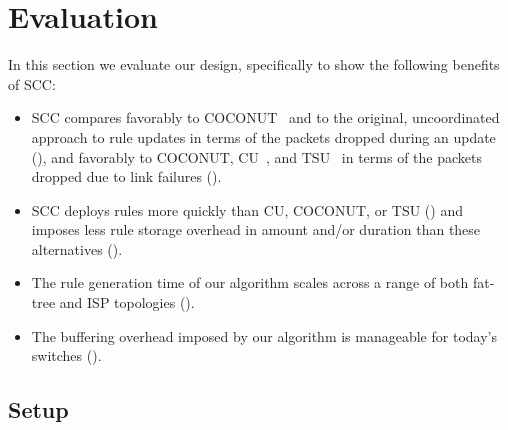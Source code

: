 \newcommand{\coconut}{\textup{COCONUT}}
\newcommand{\cu}{\textup{CU}}
\newcommand{\sys}{\textup{SCC}}
\newcommand{\tsu}{\textup{TSU}}
\newcommand{\org}{\textup{Original}}
\newcommand{\ylabel}{Number of lost packets}
\newcommand{\xlabel}{Packets per second}
\newcommand{\persistTime}{Persistent time}
\newcommand{\updateTime}{Time}

\section{Evaluation}
\label{sec:eval}

In this section we evaluate our design, specifically to show the
following benefits of SCC:
\begin{itemize}
\item SCC compares favorably to
COCONUT~\cite{COCONUT} and to the original, uncoordinated approach to
rule updates in terms of the packets dropped during an update
(), and favorably to COCONUT,
CU~\cite{CU}, and TSU~\cite{tsu} in terms of the packets dropped due
to link failures ().

\item SCC deploys rules  more quickly than CU, COCONUT, or
TSU () and imposes less rule storage
overhead in amount and/or duration than these alternatives
().

\item The rule generation time of our algorithm scales across a range
of both fat-tree and ISP topologies ().

\item The buffering overhead imposed by our algorithm is manageable
for today's switches ().
\end{itemize}

\subsection{Setup}
\label{sec:eval:setup}

